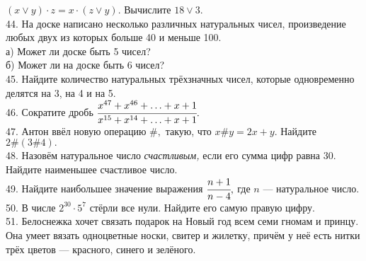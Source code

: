 $(x\vee y)\cdot z=x\cdot(z\vee y).$ Вычислите $18\vee 3.$\\
44. На доске написано несколько различных натуральных чисел, произведение любых
двух из которых больше 40 и меньше 100.\\
а) Может ли доске быть 5 чисел?\\
б) Может ли на доске быть 6 чисел?\\
45. Найдите количество натуральных трёхзначных чисел, которые одновременно делятся на 3, на 4 и на 5.\\
46. Сократите дробь $\cfrac{x^{47}+x^{46}+\ldots+x+1}{x^{15}+x^{14}+\ldots+x+1}.$\\
47. Антон  ввёл новую операцию $\#,$ такую, что $x\#y=2x+y.$ Найдите $2\#(3\#4).$\\
48. Назовём натуральное число {\it счастливым,} если его сумма цифр равна 30. Найдите наименьшее счастливое число.\\
49. Найдите наибольшее значение выражения $\cfrac{n+1}{n-4},$ где $n$ --- натуральное число.\\
50. В числе $2^{30}\cdot5^7$ стёрли все нули. Найдите его самую правую цифру.\\
51. Белоснежка хочет связать подарок на Новый год всем семи гномам и принцу. Она умеет вязать одноцветные носки, свитер и жилетку, причём у неё есть нитки трёх цветов --- красного, синего и зелёного.

